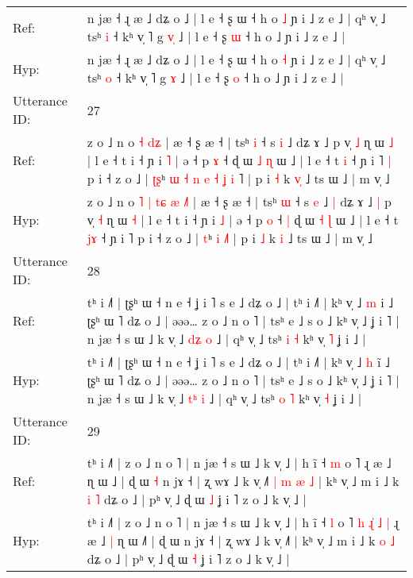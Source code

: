\documentclass[10pt]{article}
\DeclareRobustCommand{\hl}[1]{{\textcolor{red}{#1}}}
\begin{document}
\begin{longtable}{ll}
Ref: & n jæ ˧ ɻ æ ˩ dʑ o ˩ | l e ˧ ʂ ɯ ˧ h o \hl{˩} ɲ i ˩ z e ˩ | qʰ v̩ ˩ tsʰ \hl{i} ˧ kʰ v̩ ˥ g \hl{v}\hl{̩} ˩ | l e ˧ ʂ \hl{ɯ} ˧ h o ˩ ɲ i ˩ z e ˩ |
 \\
Hyp: & n jæ ˧ ɻ æ ˩ dʑ o ˩ | l e ˧ ʂ ɯ ˧ h o \hl{˧} ɲ i ˩ z e ˩ | qʰ v̩ ˩ tsʰ \hl{o} ˧ kʰ v̩ ˥ g \hl{}\hl{ɤ} ˩ | l e ˧ ʂ \hl{o} ˧ h o ˩ ɲ i ˩ z e ˩ |
 \\
\midrule
Utterance ID: & 27 \\
Ref: & z o ˩ n o\hl{}\hl{}\hl{}\hl{}\hl{}\hl{}\hl{} \hl{˧} \hl{d}\hl{ʑ} | æ ˧ ʂ æ ˧ | tsʰ \hl{i} ˧ s \hl{i} ˩\hl{}\hl{} dʑ ɤ ˩\hl{}\hl{} p v̩ \hl{˩} ɳ ɯ \hl{˩} | l e ˧ t i ˧ ɲ i \hl{˥} | ə ˧ p \hl{ɤ} ˧\hl{}\hl{} ɖ ɯ \hl{˩} \hl{ɳ} ɯ ˩ | l e ˧ t \hl{}\hl{i} ˧ ɲ i ˥\hl{ }\hl{|} p i ˧ z o ˩ | \hl{ʈ}\hl{ʂ}ʰ\hl{ }\hl{ɯ}\hl{ }\hl{˧}\hl{ }\hl{n}\hl{ }\hl{e}\hl{ }\hl{˧} \hl{ʝ} \hl{i}\hl{ }˥ | p i \hl{˧} k \hl{v}\hl{̩} ˩ ts ɯ ˩ | m v̩ ˩
 \\
Hyp: & z o ˩ n o\hl{ }\hl{˥}\hl{ }\hl{|}\hl{ }\hl{t}\hl{ɕ} \hl{æ} \hl{˩}\hl{˥} | æ ˧ ʂ æ ˧ | tsʰ \hl{ɯ} ˧ s \hl{e} ˩\hl{ }\hl{|} dʑ ɤ ˩\hl{ }\hl{|} p v̩ \hl{˧} ɳ ɯ \hl{˧} | l e ˧ t i ˧ ɲ i \hl{˩} | ə ˧ p \hl{o} ˧\hl{ }\hl{|} ɖ ɯ \hl{˧} \hl{ɭ} ɯ ˩ | l e ˧ t \hl{j}\hl{ɤ} ˧ ɲ i ˥\hl{}\hl{} p i ˧ z o ˩ | \hl{}\hl{t}ʰ\hl{}\hl{}\hl{}\hl{}\hl{}\hl{}\hl{}\hl{}\hl{}\hl{} \hl{i} \hl{}\hl{˩}˥ | p i \hl{˩} k \hl{}\hl{i} ˩ ts ɯ ˩ | m v̩ ˩
 \\
\midrule
Utterance ID: & 28 \\
Ref: & tʰ i ˩˥ | ʈʂʰ ɯ ˧ n e ˧ ʝ i ˥ s e ˩ dʑ o ˩ | tʰ i ˩˥ | kʰ v̩ ˩ \hl{m} i\hl{} ˩ ʈʂʰ ɯ ˥ dʑ o ˩ | əəə… z o ˩ n o ˥ | tsʰ e ˩ s o ˩ kʰ v̩ ˩ ʝ i ˥ | n jæ ˧ s ɯ ˩ k v̩ ˩ \hl{d}\hl{ʑ} \hl{o} ˩ | qʰ v̩ ˩ tsʰ \hl{i} \hl{˧} kʰ v̩ \hl{˥} ʝ i ˩ |
 \\
Hyp: & tʰ i ˩˥ | ʈʂʰ ɯ ˧ n e ˧ ʝ i ˥ s e ˩ dʑ o ˩ | tʰ i ˩˥ | kʰ v̩ ˩ \hl{h} i\hl{̃} ˩ ʈʂʰ ɯ ˥ dʑ o ˩ | əəə… z o ˩ n o ˥ | tsʰ e ˩ s o ˩ kʰ v̩ ˩ ʝ i ˥ | n jæ ˧ s ɯ ˩ k v̩ ˩ \hl{t}\hl{ʰ} \hl{i} ˩ | qʰ v̩ ˩ tsʰ \hl{o} \hl{˥} kʰ v̩ \hl{˧} ʝ i ˩ |
 \\
\midrule
Utterance ID: & 29 \\
Ref: & tʰ i ˩˥ | z o ˩ n o ˥ | n jæ ˧ s ɯ ˩ k v̩ ˩ | h ĩ ˧ \hl{m} o ˥\hl{}\hl{}\hl{}\hl{}\hl{}\hl{}\hl{}\hl{}\hl{} ɻ æ ˩\hl{}\hl{} ɳ ɯ ˩\hl{} | ɖ ɯ\hl{ }\hl{˧} n jɤ ˧ | ʐ wɤ ˩ k v̩ ˩˥\hl{ }\hl{|}\hl{ }\hl{m}\hl{ }\hl{æ}\hl{ }\hl{˩} | kʰ v̩ ˩ m i ˩ k \hl{i} \hl{˥} dʑ o ˩ | pʰ v̩ ˩ ɖ ɯ \hl{˩} ʝ i ˥ z o ˩ k v̩ ˩ |
 \\
Hyp: & tʰ i ˩˥ | z o ˩ n o ˥ | n jæ ˧ s ɯ ˩ k v̩ ˩ | h ĩ ˧ \hl{l} o ˥\hl{ }\hl{h}\hl{ }\hl{ɻ}\hl{̍}\hl{ }\hl{˩}\hl{ }\hl{|} ɻ æ ˩\hl{ }\hl{|} ɳ ɯ ˩\hl{˥} | ɖ ɯ\hl{}\hl{} n jɤ ˧ | ʐ wɤ ˩ k v̩ ˩˥\hl{}\hl{}\hl{}\hl{}\hl{}\hl{}\hl{}\hl{} | kʰ v̩ ˩ m i ˩ k \hl{o} \hl{˩} dʑ o ˩ | pʰ v̩ ˩ ɖ ɯ \hl{˧} ʝ i ˥ z o ˩ k v̩ ˩ |

\end{longtable}
\end{document}
